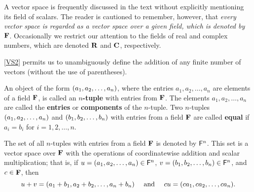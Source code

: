 \begin{note}
    A vector space is frequently discussed in the text without explicitly mentioning its field of scalars.
    The reader is cautioned to remember, however, that \emph{every vector space is regarded as a vector space over a given field, which is denoted by \(\mathbf{F}\)}.
    Occasionally we restrict our attention to the fields of real and complex numbers, which are denoted \(\mathbf{R}\) and \(\mathbf{C}\), respectively.
\end{note}

\begin{note}
    \ref{VS2} permits us to unambiguously define the addition of any finite number of vectors
    (without the use of parentheses).
\end{note}

\begin{defn}\label{1.2.3}
    An object of the form \(\left\lparen{a}_{1}, {a}_{2}, \dots, {a}_{n}\right\rparen\), where the entries \(a_{1}, a_{2}, \dots, a_{n}\) are elements of a field \(\mathbf{F}\), is called an \textbf{\(n\)-tuple} with entries from \(\mathbf{F}\).
    The elements \(a_{1}, a_{2}, \dots, a_{n}\) are called the \textbf{entries} or \textbf{components} of the \(n\)-tuple.
    Two \(n\)-tuples \(\left\lparen{a}_{1}, {a}_{2}, \dots, {a}_{n}\right\rparen\) and \(\left\lparen{b}_{1}, {b}_{2}, \dots, {b}_{n}\right\rparen\) with entries from a field \(\mathbf{F}\) are called \textbf{equal} if \(a_i = b_i\) for \(i = 1, 2, \dots, n\).
\end{defn}

\begin{eg}\label{1.2.4}
    The set of all \(n\)-tuples with entries from a field \(\mathbf{F}\) is denoted by \(\mathsf{F}^n\).
    This set is a vector space over \(\mathbf{F}\) with the operations of coordinatewise addition and scalar multiplication;
    that is, if \(u = \left\lparen{a}_{1}, {a}_{2}, \dots, {a}_{n}\right\rparen \in \mathsf{F}^n\), \(v = \left\lparen{b}_{1}, {b}_{2}, \dots, {b}_{n}\right\rparen \in \mathsf{F}^n\), and \(c \in \mathbf{F}\), then
    \[
        u + v = (a_{1} + b_{1}, a_{2} + b_{2}, \dots, a_{n} + b_{n}) \quad \text{ and } \quad cu = \tp{ca}{n}.
    \]
\end{eg}

